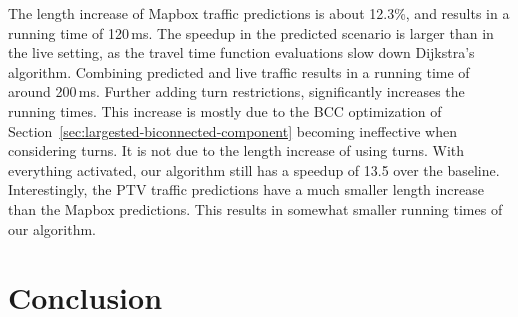 \documentclass[manuscript,review]{acmart}
\begin{document}
The length increase of Mapbox traffic predictions is about 12.3\%, and results in a running time of 120\,ms.
The speedup in the predicted scenario is larger than in the live setting, as the travel time function evaluations slow down Dijkstra's algorithm.
Combining predicted and live traffic results in a running time of around 200\,ms.
Further adding turn restrictions, significantly increases the running times.
This increase is mostly due to the BCC optimization of Section~\ref{sec:largested-biconnected-component} becoming ineffective when considering turns.
It is not due to the length increase of using turns.
With everything activated, our algorithm still has a speedup of 13.5 over the baseline.
Interestingly, the PTV traffic predictions have a much smaller length increase than the Mapbox predictions.
This results in somewhat smaller running times of our algorithm.



\section{Conclusion}
\label{sec:conclusion}
\end{document}
